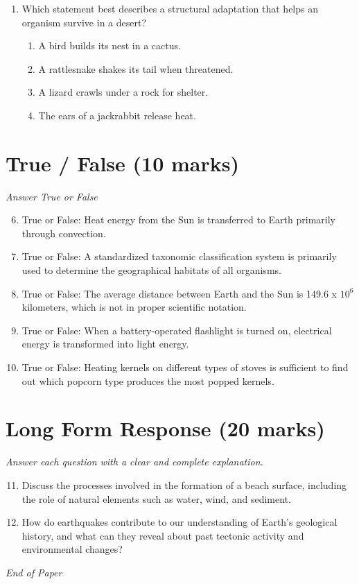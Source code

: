 \documentclass[12pt]{article}
\begin{document}
\begin{enumerate}[label=\arabic*.]
\begin{enumerate}[label=(\alph*)]
    \item size
    \item shape
    \item weight
    \item hardness
\end{enumerate}
\item Which statement best describes a structural adaptation that helps an organism survive in a desert?
\begin{enumerate}[label=(\alph*)]
    \item A bird builds its nest in a cactus.
    \item A rattlesnake shakes its tail when threatened.
    \item A lizard crawls under a rock for shelter.
    \item The ears of a jackrabbit release heat.
\end{enumerate}
\end{enumerate}

\section*{True / False (10 marks)}
\textit{Answer True or False}
\begin{enumerate}[label=\arabic*.]
\setcounter{enumi}{5}
\item True or False: Heat energy from the Sun is transferred to Earth primarily through convection.
\item True or False: A standardized taxonomic classification system is primarily used to determine the geographical habitats of all organisms.
\item True or False: The average distance between Earth and the Sun is 149.6 x $10^6$ kilometers, which is not in proper scientific notation.
\item True or False: When a battery-operated flashlight is turned on, electrical energy is transformed into light energy.
\item True or False: Heating kernels on different types of stoves is sufficient to find out which popcorn type produces the most popped kernels.
\end{enumerate}

\section*{Long Form Response (20 marks)}
\textit{Answer each question with a clear and complete explanation.}
\begin{enumerate}[label=\arabic*.]
\setcounter{enumi}{10}
\item Discuss the processes involved in the formation of a beach surface, including the role of natural elements such as water, wind, and sediment.
\item How do earthquakes contribute to our understanding of Earth's geological history, and what can they reveal about past tectonic activity and environmental changes?
\end{enumerate}

\vfill
\noindent\textit{End of Paper}
\end{document}
